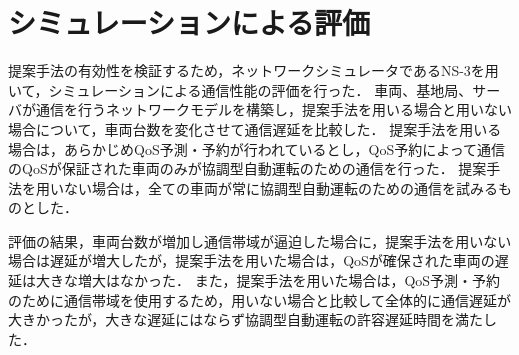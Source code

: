 \documentclass[a4paper,10pt,twocolumn,uplatex]{jsarticle}
\begin{document}
\section{シミュレーションによる評価}
\label{simulation}
提案手法の有効性を検証するため，ネットワークシミュレータであるNS-3\cite{ns3}を用いて，シミュレーションによる通信性能の評価を行った．
車両、基地局、サーバが通信を行うネットワークモデルを構築し，提案手法を用いる場合と用いない場合について，車両台数を変化させて通信遅延を比較した．
提案手法を用いる場合は，あらかじめQoS予測・予約が行われているとし，QoS予約によって通信のQoSが保証された車両のみが協調型自動運転のための通信を行った．
提案手法を用いない場合は，全ての車両が常に協調型自動運転のための通信を試みるものとした．\par
評価の結果，車両台数が増加し通信帯域が逼迫した場合に，提案手法を用いない場合は遅延が増大したが，提案手法を用いた場合は，QoSが確保された車両の遅延は大きな増大はなかった．
また，提案手法を用いた場合は，QoS予測・予約のために通信帯域を使用するため，用いない場合と比較して全体的に通信遅延が大きかったが，大きな遅延にはならず協調型自動運転の許容遅延時間を満たした．

\end{document}

